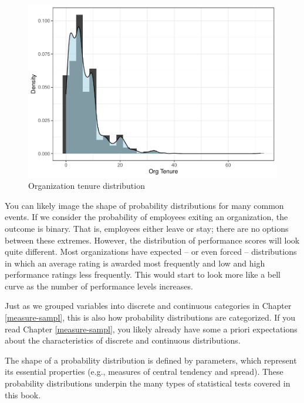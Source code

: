 \documentclass[
]{book}
\begin{document}
\begin{figure}

{\centering \includegraphics{The_Fundamentals_of_People_Analytics_files/figure-latex/org-tenure-dist-1} 

}

\caption{Organization tenure distribution}\label{fig:org-tenure-dist}
\end{figure}

You can likely image the shape of probability distributions for many common events. If we consider the probability of employees exiting an organization, the outcome is binary. That is, employees either leave or stay; there are no options between these extremes. However, the distribution of performance scores will look quite different. Most organizations have expected -- or even forced -- distributions in which an average rating is awarded most frequently and low and high performance ratings less frequently. This would start to look more like a bell curve as the number of performance levels increases.

Just as we grouped variables into discrete and continuous categories in Chapter \ref{measure-sampl}, this is also how probability distributions are categorized. If you read Chapter \ref{measure-sampl}, you likely already have some a priori expectations about the characteristics of discrete and continuous distributions.

The shape of a probability distribution is defined by parameters, which represent its essential properties (e.g., measures of central tendency and spread). These probability distributions underpin the many types of statistical tests covered in this book.
\end{document}
